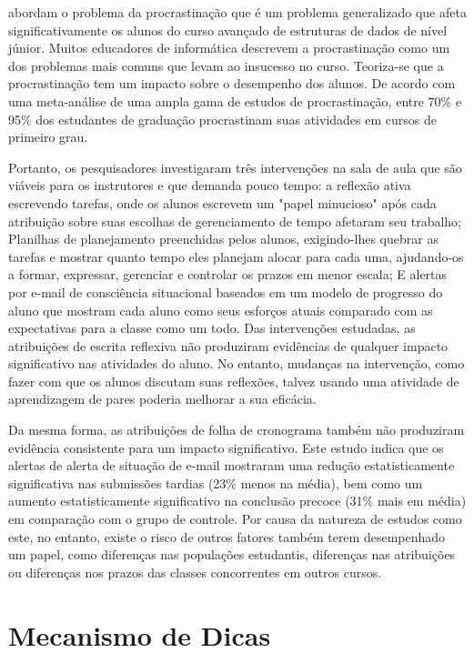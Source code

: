  abordam o problema da procrastinação que é um problema generalizado que afeta significativamente os alunos do curso avançado de estruturas de dados de nível júnior. Muitos educadores de informática descrevem a procrastinação como um dos problemas mais comuns que levam ao insucesso no curso. Teoriza-se que a procrastinação tem um impacto sobre o desempenho dos alunos. De acordo com uma meta-análise de uma ampla gama de estudos de procrastinação, entre 70\% e 95\% dos estudantes de graduação procrastinam suas atividades em cursos de primeiro grau. 

Portanto, os pesquisadores investigaram três intervenções na sala de aula que são viáveis para os instrutores e que demanda pouco tempo: a reflexão ativa escrevendo tarefas, onde os alunos escrevem um "papel minucioso" após cada atribuição sobre suas escolhas de gerenciamento de tempo afetaram seu trabalho; Planilhas de planejamento preenchidas pelos alunos, exigindo-lhes quebrar as tarefas e mostrar quanto tempo eles planejam alocar para cada uma,  ajudando-os a formar, expressar, gerenciar e controlar os prazos em menor escala; E alertas por e-mail de consciência situacional baseados em um modelo de progresso do aluno que mostram cada aluno como seus esforços atuais comparado com as expectativas para a classe como um todo. Das intervenções estudadas, as atribuições de escrita reflexiva não produziram evidências de qualquer impacto significativo nas atividades do aluno. No entanto, mudanças na intervenção, como fazer com que os alunos discutam suas reflexões, talvez usando uma atividade de aprendizagem de pares poderia melhorar a sua eficácia. 

Da mesma forma, as atribuições de folha de cronograma também não produziram evidência consistente para um impacto significativo. Este estudo indica que os alertas de alerta de situação de e-mail mostraram uma redução estatisticamente significativa nas submissões tardias (23\% menos na média), bem como um aumento estatisticamente significativo na conclusão precoce (31\% mais em média) em comparação com o grupo de controle. Por causa da natureza de estudos como este, no entanto, existe o risco de outros fatores também terem desempenhado um papel, como diferenças nas populações estudantis, diferenças nas atribuições ou diferenças nos prazos das classes concorrentes em outros cursos.

\section{Mecanismo de Dicas}

